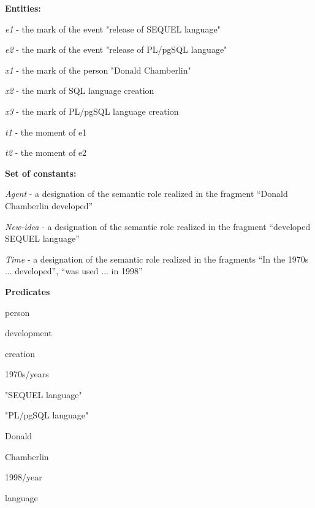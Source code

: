 \documentclass[a4paper,12pt,fleqn]{article}
\begin{document}
\vspace{1cm}

\textbf{Entities:}
\begin{compactenum}
\item \textit{e1} - the mark of the event "release of SEQUEL language"
\item \textit{e2} - the mark of the event "release of PL/pgSQL language"
\item \textit{x1} - the mark of the person "Donald Chamberlin"
\item \textit{x2} - the mark of SQL language creation
\item \textit{x3} - the mark of PL/pgSQL language creation
\item \textit{t1} - the moment of e1
\item \textit{t2} - the moment of e2
\end{compactenum}

\vspace{1cm}

\textbf{Set of constants:}
\begin{compactenum}
\item \textit{Agent} - a designation of the semantic role realized in the fragment “Donald Chamberlin developed”
\item \textit{New-idea} - a designation of the semantic role realized in the fragment “developed SEQUEL language”
\item \textit{Time} - a designation of the semantic role realized in the fragments “In the 1970s ... developed”, “was used ... in 1998”
\end{compactenum}

\vspace{1cm}

\textbf{Predicates}
\begin{compactenum}
\item person
\item development
\item creation
\item 1970s/years
\item "SEQUEL language"
\item "PL/pgSQL language"
\item Donald
\item Chamberlin
\item 1998/year
\item language
\end{compactenum}

\vspace{1cm}
\end{document}
